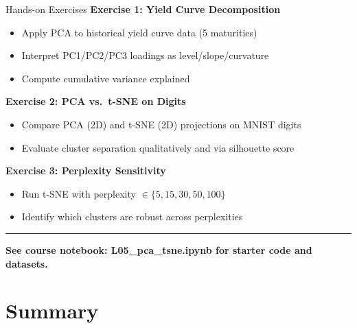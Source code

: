 \documentclass[8pt,aspectratio=169]{beamer}
\newcommand{\bottomnote}[1]{%
\vfill
\vspace{-2mm}
\textcolor{mllavender2}{\rule{\textwidth}{0.4pt}}
\vspace{1mm}
\footnotesize
\textbf{#1}
}
\begin{document}
\begin{frame}[t]{Hands-on Exercises}
\textbf{Exercise 1: Yield Curve Decomposition}
\begin{itemize}
  \item Apply PCA to historical yield curve data (5 maturities)
  \item Interpret PC1/PC2/PC3 loadings as level/slope/curvature
  \item Compute cumulative variance explained
\end{itemize}

\vspace{0.3em}
\textbf{Exercise 2: PCA vs.\ t-SNE on Digits}
\begin{itemize}
  \item Compare PCA (2D) and t-SNE (2D) projections on MNIST digits
  \item Evaluate cluster separation qualitatively and via silhouette score
\end{itemize}

\vspace{0.3em}
\textbf{Exercise 3: Perplexity Sensitivity}
\begin{itemize}
  \item Run t-SNE with perplexity $\in \{5, 15, 30, 50, 100\}$
  \item Identify which clusters are robust across perplexities
\end{itemize}
\bottomnote{See course notebook: L05\_pca\_tsne.ipynb for starter code and datasets.}
\end{frame}

\section{Summary}
\end{document}
